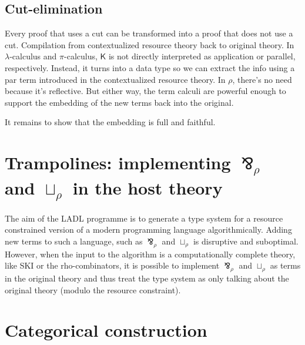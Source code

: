 \documentclass{llncs}
\renewcommand{\:}{\colon}
\newcommand{\pic}{$\pi$-calculus}
\begin{document}
\subsection{Cut-elimination}
Every proof that uses a cut can be transformed into a proof that does
not use a cut.  Compilation from contextualized resource theory back
to original theory. In $\lambda$-calculus and {\pic}, $\mathsf{K}$ is
not directly interpreted as application or parallel,
respectively. Instead, it turns into a data type so we can extract the
info using a par term introduced in the contextualized resource
theory.  In $\rho$, there's no need because it's reflective.  But either
way, the term calculi are powerful enough to support the embedding of
the new terms back into the original.

It remains to show that the embedding is full and faithful. 

\section{Trampolines: implementing $\bindnasrepma_{\rho}$ and $\sqcup_{\rho}$ in the host theory}

The aim of the LADL programme is to generate a type system for a resource constrained version of a modern programming language algorithmically. Adding new terms to such a language, such as $\bindnasrepma_{\rho}$ and $\sqcup_{\rho}$ is disruptive and suboptimal. However, when the input to the algorithm is a computationally complete theory, like SKI or the rho-combinators, it is possible to implement $\bindnasrepma_{\rho}$ and $\sqcup_{\rho}$ as terms in the original theory and thus treat the type system as only talking about the original theory (modulo the resource constraint).

\section{Categorical construction}



\end{document}
